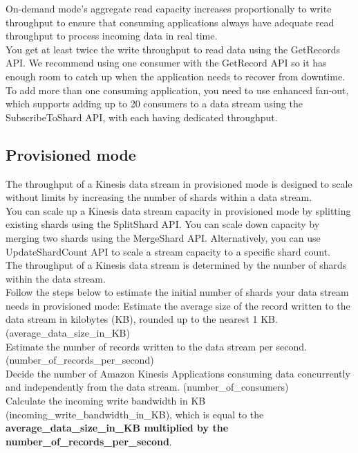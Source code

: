 \documentclass[12pt, letterpaper, twoside]{article}
\begin{document}
On-demand mode’s aggregate read capacity increases proportionally to write throughput to ensure that consuming applications always 
have adequate read throughput to process incoming data in real time.\\
You get at least twice the write throughput to read data using the GetRecords API. We recommend using one consumer with the GetRecord 
API so it has enough room to catch up when the application needs to recover from downtime. To add more than one consuming application,
you need to use enhanced fan-out, which supports adding up to 20 consumers to a data stream using the SubscribeToShard API, with 
each having dedicated throughput.\\

\subsection{Provisioned mode}
The throughput of a Kinesis data stream in provisioned mode is designed to scale without limits by increasing the number of shards 
within a data stream.\\

You can scale up a Kinesis data stream capacity in provisioned mode by splitting existing shards using the SplitShard API. You can 
scale down capacity by merging two shards using the MergeShard API. Alternatively, you can use UpdateShardCount API to scale a stream 
capacity to a specific shard count.\\

The throughput of a Kinesis data stream is determined by the number of shards within the data stream.\\
Follow the steps below to estimate the initial number of shards your data stream needs in provisioned mode:
Estimate the average size of the record written to the data stream in kilobytes (KB), rounded up to the nearest 1 KB. 
(average\_data\_size\_in\_KB)\\

Estimate the number of records written to the data stream per second. (number\_of\_records\_per\_second)\\

Decide the number of Amazon Kinesis Applications consuming data concurrently and independently from the data stream. 
(number\_of\_consumers)\\

Calculate the incoming write bandwidth in KB (incoming\_write\_bandwidth\_in\_KB), which is equal to the 
\textbf{average\_data\_size\_in\_KB multiplied by the number\_of\_records\_per\_second}.\\
\end{document}
